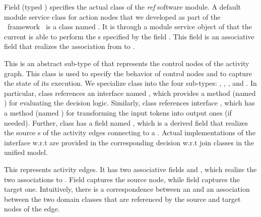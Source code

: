 \begin{description}
%
Field  (typed ) specifies the actual  class of the \textit{ref} software module. 
A default module service class for action nodes that we developed as part of the \jdomainapp~framework~\cite{le_jdomainapp_2017} is a class named .
It is through a module service object of  that the current  is able to perform the s specified by the field . This field is an associative field that realizes the association from  to .
%
\item[\clazz{ControlNode}.] This is an abstract sub-type of  that represents the control nodes of the activity graph. This class is used to specify the behavior of control nodes and to capture the state of its execution. We specialize class  into the four sub-types: , , , and . 
In particular, class  references an interface named , which provides a method (named ) for evaluating the decision logic. Similarly, class  references interface , which has a method (named ) for transforming the input tokens into output ones (if needed).
Further, class  has a field named , which is a derived field that realizes the source s of the activity edges connecting to a .
%
Actual implementations of the interface  w.r.t  are provided in the corresponding decision w.r.t join classes in the unified model.
%
\item[\clazz{Edge}.] This represents activity edges. It has two associative fields  and , which realize the two associations to . Field  captures the source node, while field  captures the target one. Intuitively, there is a correspondence between an  and an association between the two domain classes that are referenced by the source and target nodes of the edge.
\end{description}

